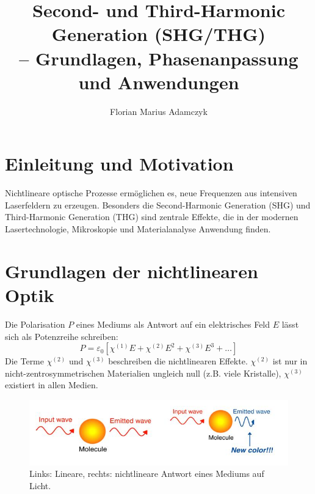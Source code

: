 \documentclass[9pt,a4paper,twocolumn,twoside]{tau-class/tau}
\title{Second- und Third-Harmonic Generation (SHG/THG) \\ – Grundlagen, Phasenanpassung und Anwendungen}
\author[a,1]{Florian Marius Adamczyk}
\affil[a]{Justus-Liebig-Universität Gießen, Institut für Physik, Deutschland}
\begin{document}
		
    \maketitle 
    \thispagestyle{firststyle} 
    \tauabstract 
    

\section{Einleitung und Motivation}
Nichtlineare optische Prozesse ermöglichen es, neue Frequenzen aus intensiven Laserfeldern zu erzeugen. Besonders die Second-Harmonic Generation (SHG) und Third-Harmonic Generation (THG) sind zentrale Effekte, die in der modernen Lasertechnologie, Mikroskopie und Materialanalyse Anwendung finden.



\section{Grundlagen der nichtlinearen Optik}
Die Polarisation $P$ eines Mediums als Antwort auf ein elektrisches Feld $E$ lässt sich als Potenzreihe schreiben:
\begin{equation}
P = \varepsilon_0\left[\chi^{(1)}E + \chi^{(2)}E^2 + \chi^{(3)}E^3 + \dots\right]
\end{equation}
Die Terme $\chi^{(2)}$ und $\chi^{(3)}$ beschreiben die nichtlinearen Effekte. $\chi^{(2)}$ ist nur in nicht-zentrosymmetrischen Materialien ungleich null (z.B. viele Kristalle), $\chi^{(3)}$ existiert in allen Medien.

\begin{figure}[!ht]
\centering
\includegraphics[width=0.6\columnwidth]{../praes/Images/Fig.1 optics.jpeg}
\caption{Links: Lineare, rechts: nichtlineare Antwort eines Mediums auf Licht.\cite{Science20NonlinearOptics2014}}
\end{figure}
\end{document}
